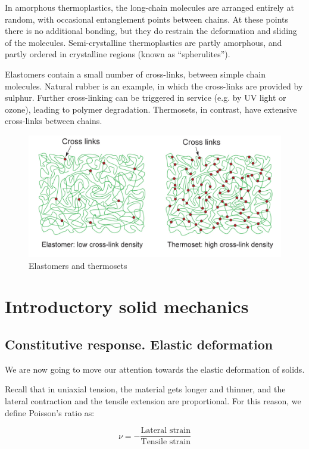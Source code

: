\documentclass{article}
\begin{document}
In amorphous thermoplastics, the long-chain molecules are arranged entirely at random, with occasional entanglement points between chains. At these points there is no additional bonding, but they do restrain the deformation and sliding of the molecules. Semi-crystalline thermoplastics are partly amorphous, and partly ordered in crystalline regions (known as “spherulites”).

\begin{definition}
    Elastomers contain a small number of cross-links, between simple chain molecules. Natural rubber is an example, in which the cross-links are provided by sulphur. Further cross-linking can be triggered in service (e.g. by UV light or ozone), leading to polymer degradation. Thermosets, in contrast, have extensive cross-links between chains.
\end{definition}

\begin{figure}[h]
    \centering
    \includegraphics{images/mat15.png}
    \caption{Elastomers and thermosets}
    \label{fig:enter-label}
\end{figure}

\newpage

\section{Introductory solid mechanics}

\subsection{Constitutive response. Elastic deformation}

We are now going to move our attention towards the elastic deformation of solids.

\begin{definition}
    Recall that in uniaxial tension, the material gets longer and thinner, and the lateral contraction and the tensile extension are proportional. For this reason, we define Poisson's ratio as:

    \[ \nu = -\frac{\text{Lateral strain}}{\text{Tensile strain}} \]
\end{definition}
\end{document}
